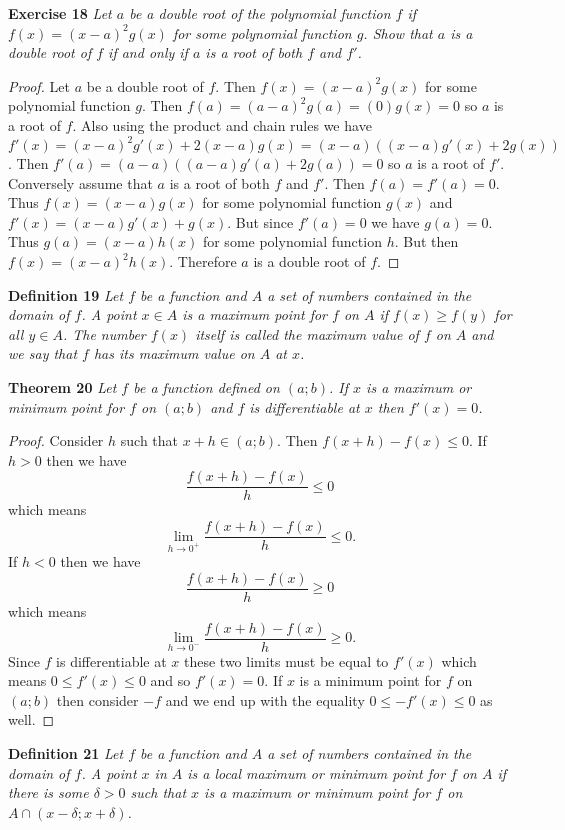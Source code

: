 \documentclass{article}
\begin{document}
\begin{flushleft}
\textbf{Exercise 18}
\textsl{Let $a$ be a double root of the polynomial function $f$ if $f(x) = (x-a)^2g(x)$ for some polynomial function $g$. Show that $a$ is a double root of $f$ if and only if $a$ is a root of both $f$ and $f'$.}
\begin{proof}
Let $a$ be a double root of $f$. Then $f(x) = (x-a)^2g(x)$ for some polynomial function $g$. Then $f(a) = (a-a)^2g(a) = (0)g(x) = 0$ so $a$ is a root of $f$. Also using the product and chain rules we have $f'(x) = (x-a)^2g'(x) + 2(x-a)g(x) = (x-a)((x-a)g'(x) + 2g(x))$. Then $f'(a) = (a-a)((a-a)g'(a) + 2g(a)) = 0$ so $a$ is a root of $f'$. Conversely assume that $a$ is a root of both $f$ and $f'$. Then $f(a) = f'(a) = 0$. Thus $f(x) = (x-a)g(x)$ for some polynomial function $g(x)$ and $f'(x) = (x-a)g'(x) + g(x)$. But since $f'(a) = 0$ we have $g(a) = 0$. Thus $g(a) = (x-a) h(x)$ for some polynomial function $h$. But then $f(x) = (x-a)^2h(x)$. Therefore $a$ is a double root of $f$.
\end{proof}

\textbf{Definition 19}
\textsl{Let $f$ be a function and $A$ a set of numbers contained in the domain of $f$. A point $x \in A$ is a maximum point for $f$ on $A$ if $f(x) \geq f(y)$ for all $y \in A$. The number $f(x)$ itself is called the maximum value of $f$ on $A$ and we say that $f$ has its maximum value on $A$ at $x$.}\newline

\textbf{Theorem 20}
\textsl{Let $f$ be a function defined on $(a;b)$. If $x$ is a maximum or minimum point for $f$ on $(a;b)$ and $f$ is differentiable at $x$ then $f'(x) = 0$.}
\begin{proof}
Consider $h$ such that $x+h \in (a;b)$. Then $f(x+h) - f(x) \leq 0$. If $h > 0$ then we have
\[
\frac{f(x+h) - f(x)}{h} \leq 0
\]
which means
\[
\lim_{h \rightarrow 0^+} \frac{f(x+h)-f(x)}{h} \leq 0.
\]
If $h < 0$ then we have
\[
\frac{f(x+h) - f(x)}{h} \geq 0
\]
which means
\[
\lim_{h \rightarrow 0^-} \frac{f(x+h)-f(x)}{h} \geq 0.
\]
Since $f$ is differentiable at $x$ these two limits must be equal to $f'(x)$ which means $0 \leq f'(x) \leq 0$ and so $f'(x) = 0$. If $x$ is a minimum point for $f$ on $(a;b)$ then consider $-f$ and we end up with the equality $0 \leq -f'(x) \leq 0$ as well.
\end{proof}

\textbf{Definition 21}
\textsl{Let $f$ be a function and $A$ a set of numbers contained in the domain of $f$. A point $x$ in $A$ is a local maximum or minimum point for $f$ on $A$ if there is some $\delta > 0$ such that $x$ is a maximum or minimum point for $f$ on $A \cap (x - \delta; x + \delta)$.}\newline


\end{flushleft}
\end{document}
